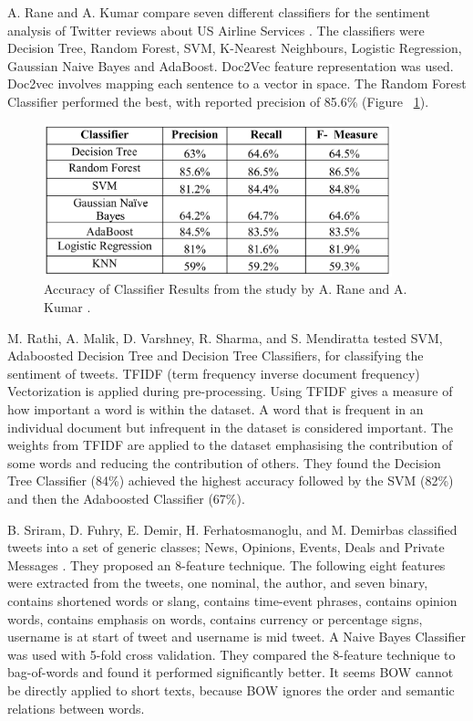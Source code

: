 A. Rane and A. Kumar compare seven different classifiers for the sentiment analysis of Twitter reviews about US Airline Services \cite{Rane2018}. The classifiers were Decision Tree, Random Forest, SVM, K-Nearest Neighbours, Logistic Regression, Gaussian Naive Bayes and AdaBoost. Doc2Vec feature representation was used. Doc2vec involves mapping each sentence to a vector in space. The Random Forest Classifier performed the best, with reported precision of 85.6\% (Figure ~\ref{fig:arane}). 
\begin{figure}[h!]
\centering
\includegraphics[width=0.9\textwidth]{literature_review/arane_classifier_results.PNG}
\caption{\label{fig:arane} Accuracy of Classifier Results from the study by A. Rane and A. Kumar \cite{Rane2018}.}
\end{figure}

M. Rathi, A. Malik, D. Varshney, R. Sharma, and S. Mendiratta \cite{Raithi2018} tested SVM, Adaboosted Decision Tree and Decision Tree Classifiers, for classifying the sentiment of tweets. TFIDF (term frequency inverse document frequency) Vectorization is applied during pre-processing. Using TFIDF gives a measure of how important a word is within the dataset. A word that is frequent in an individual document but infrequent in the dataset is considered important. The weights from TFIDF are applied to the dataset emphasising the contribution of some words and reducing the contribution of others. They found the Decision Tree Classifier (84\%) achieved the highest accuracy followed by the SVM (82\%) and then the Adaboosted Classifier (67\%). 

B. Sriram, D. Fuhry, E. Demir, H. Ferhatosmanoglu, and M. Demirbas classified tweets into a set of generic classes; News, Opinions, Events, Deals and Private Messages \cite{sriram2010}. They proposed an 8-feature technique. The following eight features were extracted from the tweets, one nominal, the author, and seven binary, contains shortened words or slang, contains time-event phrases, contains opinion words, contains emphasis on words, contains currency or percentage signs, username is at start of tweet and username is mid tweet. A Naive Bayes Classifier was used with 5-fold cross validation. They compared the 8-feature technique to bag-of-words and found it performed significantly better. It seems BOW cannot be directly applied to short texts, because BOW ignores the order and semantic relations between words.


